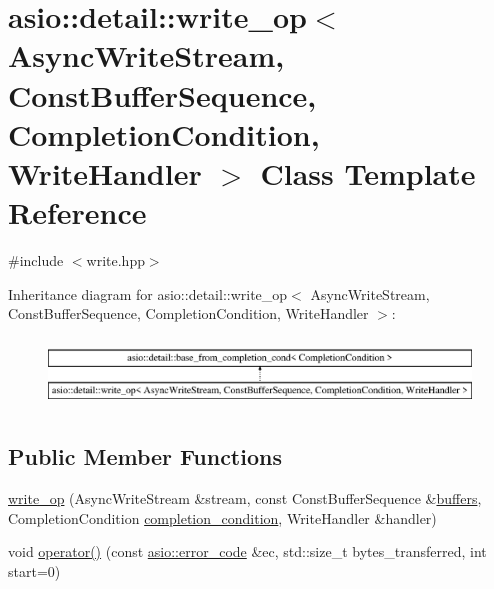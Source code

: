 \hypertarget{classasio_1_1detail_1_1write__op}{}\section{asio\+:\+:detail\+:\+:write\+\_\+op$<$ Async\+Write\+Stream, Const\+Buffer\+Sequence, Completion\+Condition, Write\+Handler $>$ Class Template Reference}
\label{classasio_1_1detail_1_1write__op}


{\ttfamily \#include $<$write.\+hpp$>$}

Inheritance diagram for asio\+:\+:detail\+:\+:write\+\_\+op$<$ Async\+Write\+Stream, Const\+Buffer\+Sequence, Completion\+Condition, Write\+Handler $>$\+:\begin{figure}[H]
\begin{center}
\leavevmode
\includegraphics[height=1.866667cm]{classasio_1_1detail_1_1write__op}
\end{center}
\end{figure}
\subsection*{Public Member Functions}
\begin{DoxyCompactItemize}
\item 
\hyperlink{classasio_1_1detail_1_1write__op_a9e643cf38742b07da4dba17ae3338de3}{write\+\_\+op} (Async\+Write\+Stream \&stream, const Const\+Buffer\+Sequence \&\hyperlink{group__async__read_ga54dede45c3175148a77fe6635222c47d}{buffers}, Completion\+Condition \hyperlink{group__async__read_gae2e215d5013596cc2b385bb6c13fa518}{completion\+\_\+condition}, Write\+Handler \&handler)
\item 
void \hyperlink{classasio_1_1detail_1_1write__op_a37ae71b86190227b9a290b7115fb4f3f}{operator()} (const \hyperlink{classasio_1_1error__code}{asio\+::error\+\_\+code} \&ec, std\+::size\+\_\+t bytes\+\_\+transferred, int start=0)
\end{DoxyCompactItemize}
